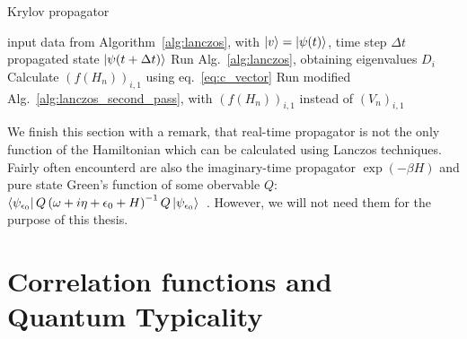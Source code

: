 \begin{algorithm}
	\algrenewcommand{}
	\algrenewcommand{}
	\caption{Krylov propagator}
	\label{alg:krylov_propagator}
	\begin{algorithmic}[1]
	\Require input data from Algorithm~\ref{alg:lanczos}, with \(\ket{v} = \ket{\psi(t)}\), time step \(\Delta t\)
	\Ensure propagated state \(\ket{\psi(t+\Delta t)}\)
		\State Run Alg.~\ref{alg:lanczos}, obtaining eigenvalues \(D_i\)
		\State Calculate \(\left(f(H_n)\right)_{i,1}\) using eq.~\eqref{eq:c_vector}
		\State Run modified Alg.~\ref{alg:lanczos_second_pass}, with \(\left(f(H_n)\right)_{i,1}\) instead of \(\left(V_n\right)_{i,1}\)
	\end{algorithmic}
\end{algorithm}

We finish this section with a remark, that real-time propagator is not the only function of the Hamiltonian which can
be calculated using Lanczos techniques. Fairly often encounterd are also the imaginary-time propagator \(\exp\left(-\beta H\right)\)
and pure state Green's function of some obervable \(Q\): \(\bra{\psi_{\epsilon_0}} Q \left(\omega + i\eta +\epsilon_0  
+ H \right)^{-1} Q \ket{\psi_{\epsilon_0}}\)~\autocite{Dagotto1994}. However, we will not need them for the purpose of this thesis.


\section{Correlation functions and Quantum Typicality}

